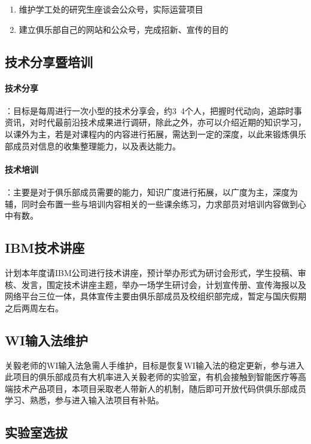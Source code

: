 \documentclass{club}
\begin{document}
\begin{enumerate}
    \item 维护学工处的研究生座谈会公众号，实际运营项目
    \item 建立俱乐部自己的网站和公众号，完成招新、宣传的目的
\end{enumerate}

\subsection{技术分享暨培训}

\paragraph{技术分享}：目标是每周进行一次小型的技术分享会，约3~4个人，把握时代动向，追踪时事资讯，对时代最前沿技术成果进行调研，除此之外，亦可以介绍近期的知识学习，以课外为主，若是对课程内的内容进行拓展，需达到一定的深度，以此来锻炼俱乐部成员对信息的收集整理能力，以及表达能力。

\paragraph{技术培训}：主要是对于俱乐部成员需要的能力，知识广度进行拓展，以广度为主，深度为辅，同时会布置一些与培训内容相关的一些课余练习，力求部员对培训内容做到心中有数。

\subsection{IBM技术讲座}

计划本年度请IBM公司进行技术讲座，预计举办形式为研讨会形式，学生投稿、审核、发言，围定技术讲座主题，举办一场学生研讨会，计划宣传册、宣传海报以及网络平台三位一体，具体宣传主要由俱乐部成员及校组织部完成，暂定与国庆假期之后两周左右。

\subsection{WI输入法维护}

关毅老师的WI输入法急需人手维护，目标是恢复WI输入法的稳定更新，参与进入此项目的俱乐部成员有大机率进入关毅老师的实验室，有机会接触到智能医疗等高端技术产品项目，本项目采取老人带新人的机制，随后即可开放代码供俱乐部成员学习、熟悉，参与进入输入法项目有补贴。

\subsection{实验室选拔}
\end{document}
